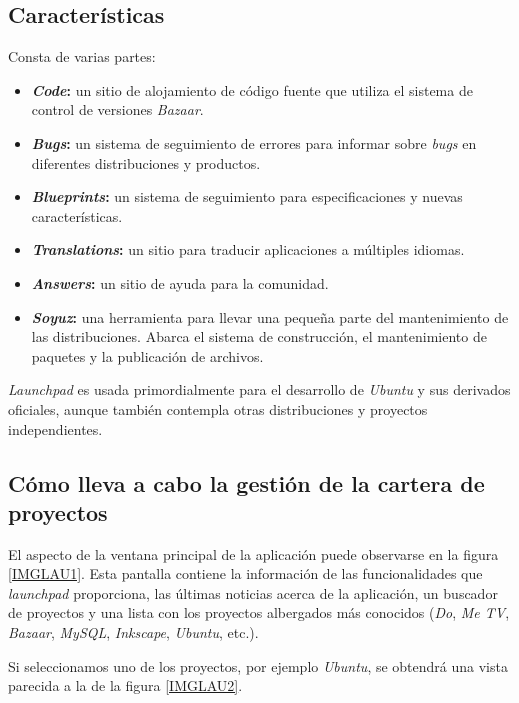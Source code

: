 \documentclass[11pt,a4paper,spanish,twoside]{report}
\begin{document}
	\subsection{Características}
	Consta de varias partes:
	\begin{itemize}
	\item \textbf{\emph{Code}:} un sitio de alojamiento de código
	fuente que utiliza el	sistema de control de versiones \emph{Bazaar}.
	\item \textbf{\emph{Bugs}:} un sistema de seguimiento de errores para
	informar sobre \emph{bugs} en diferentes distribuciones y productos.
	\item \textbf{\emph{Blueprints}:} un sistema de seguimiento para
	especificaciones y nuevas características.
	\item \textbf{\emph{Translations}:} un sitio para traducir aplicaciones
	a múltiples	idiomas.
	\item \textbf{\emph{Answers}:} un sitio de ayuda para la comunidad.
	\item \textbf{\emph{Soyuz}:} una herramienta para llevar una pequeña parte
	del	mantenimiento de las distribuciones. Abarca el sistema de construcción,
	el mantenimiento de paquetes y la publicación de archivos.
	\end{itemize}

	\emph{Launchpad} es usada primordialmente para el desarrollo de
	\emph{Ubuntu} y sus	derivados oficiales, aunque también contempla otras
	distribuciones y proyectos independientes.

	\subsection{Cómo lleva a cabo la gestión de la cartera de proyectos}
	El aspecto de la ventana principal de la aplicación puede observarse en la
	figura \ref{IMGLAU1}. Esta pantalla contiene la información de las
	funcionalidades que \emph{launchpad} proporciona, las últimas noticias
	acerca de la aplicación, un buscador de proyectos y una lista con los
	proyectos albergados más conocidos (\emph{Do}, \emph{Me TV}, \emph{Bazaar},
	\emph{MySQL}, \emph{Inkscape}, \emph{Ubuntu}, etc.).


	Si seleccionamos uno de los proyectos, por ejemplo \emph{Ubuntu}, se
	obtendrá una vista parecida a la de la figura \ref{IMGLAU2}.

\end{document}
